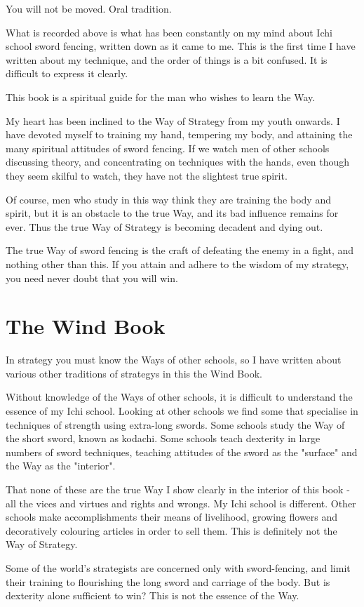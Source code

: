 \documentclass[12pt]{report}
\newcommand{\mychapter}[2]{
\setcounter{chapter}{#1}
    \setcounter{section}{0}
    \chapter*{#2}
    \addcontentsline{toc}{chapter}{#2}
}
\begin{document}
You will not be moved. Oral tradition.

What is recorded above is what has been constantly on my mind about Ichi school sword fencing, written down as it came to me. This is the first time I have written about my technique, and the order of things is a bit confused. It is difficult to express it clearly.

This book is a spiritual guide for the man who wishes to learn the Way.

My heart has been inclined to the Way of Strategy from my youth onwards. I have devoted myself to training my hand, tempering my body, and attaining the many spiritual attitudes of sword fencing. If we watch men of other schools discussing theory, and concentrating on techniques with the hands, even though they seem skilful to watch, they have not the slightest true spirit.

Of course, men who study in this way think they are training the body and spirit, but it is an obstacle to the true Way, and its bad influence remains for ever. Thus the true Way of Strategy is becoming decadent and dying out.

The true Way of sword fencing is the craft of defeating the enemy in a fight, and nothing other than this. If you attain and adhere to the wisdom of my strategy, you need never doubt that you will win.
\mychapter{5}{The Wind Book}
In strategy you must know the Ways of other schools, so I have written about various other traditions of strategys in this the Wind Book.

Without knowledge of the Ways of other schools, it is difficult to understand the essence of my Ichi school. Looking at other schools we find some that specialise in techniques of strength using extra-long swords. Some schools study the Way of the short sword, known as kodachi. Some schools teach dexterity in large numbers of sword techniques, teaching attitudes of the sword as the "surface" and the Way as the "interior".

That none of these are the true Way I show clearly in the interior of this book - all the vices and virtues and rights and wrongs. My Ichi school is different. Other schools make accomplishments their means of livelihood, growing flowers and decoratively colouring articles in order to sell them. This is definitely not the Way of Strategy.

Some of the world's strategists are concerned only with sword-fencing, and limit their training to flourishing the long sword and carriage of the body. But is dexterity alone sufficient to win? This is not the essence of the Way.
\end{document}
